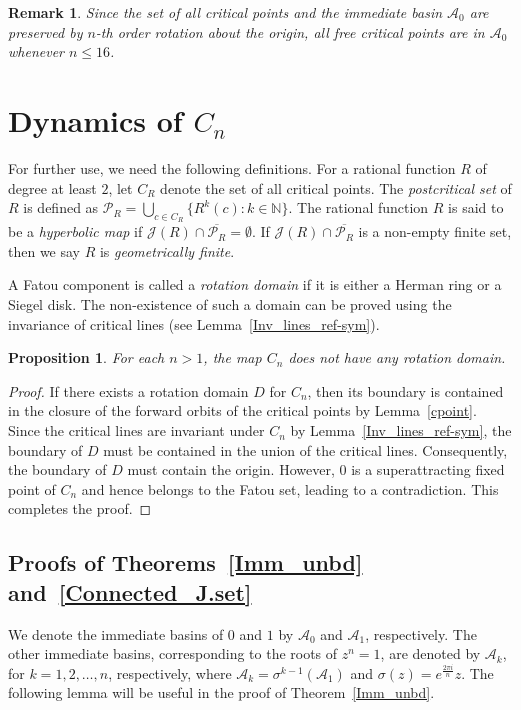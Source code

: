 \documentclass[12pt]{article}
\newtheorem{prop}{Proposition}[section]
\newtheorem{rem}{Remark}[section]
\begin{document}
\begin{rem}\label{Crit_A_0}
   Since the set of all critical points and the immediate basin $\mathcal{A}_0$ are preserved by $n$-th order rotation about the origin, all free critical points are in $\mathcal{A}_0$ whenever $n \leq 16$.
\end{rem}

	
\section{Dynamics of $C_n$}\label{S4_Dynamics}
For further use, we need the following definitions. For a rational function $R$ of degree at least $2$, let $C_R$ denote the set of all critical points. The \emph{postcritical set} of $R$ is defined as $\mathcal{P}_R = \bigcup_{c \in C_R} \{R^k(c) : k \in \mathbb{N}\}$. The rational function $R$ is said to be a \emph{hyperbolic map} if $\mathcal{J}(R) \cap \overline{\mathcal{P}_R}= \emptyset$. If $\mathcal{J}(R) \cap \overline{\mathcal{P}_R}$ is a non-empty finite set, then we say $R$ is 
\emph{geometrically finite}.

A Fatou component is called a \emph{rotation domain} if it is either a Herman ring or a Siegel disk. The non-existence of such a domain can be proved using the invariance of critical lines (see Lemma~\ref{Inv_lines_ref-sym}).
\begin{prop}\label{no_rot-dom}
For each $n>1$,	the map $C_n$ does not have any rotation domain.
\end{prop}

\begin{proof}
If there exists a rotation domain $D$ for $C_n$, then its boundary is contained in the closure of the forward orbits of the critical points by Lemma~\ref{cpoint}. Since the critical lines  are invariant under $C_{n}$ by Lemma~\ref{Inv_lines_ref-sym},  the boundary of $D$ must be contained in the union of the critical lines. Consequently, the boundary of $D$ must contain the origin. However, $0$ is a superattracting fixed point of $C_n$ and hence belongs to the Fatou set, leading to a contradiction. This completes the proof.
\end{proof}
	
\subsection{Proofs of Theorems~\ref{Imm_unbd} and~\ref{Connected_J.set}}

We denote the immediate basins of $0$ and $1$ by $\mathcal{A}_0$ and $\mathcal{A}_1$, respectively. The other immediate basins, corresponding to the roots of $z^n=1$, are denoted by $\mathcal{A}_k$, for $k=1,2,\dots, n$, respectively, where $\mathcal{A}_{k}=\sigma^{k-1}(\mathcal{A}_1)$ and $\sigma(z)=e^{\frac{2\pi i}{n}}z $.
The following lemma will be useful in the proof of Theorem~\ref{Imm_unbd}.
	
\end{document}

